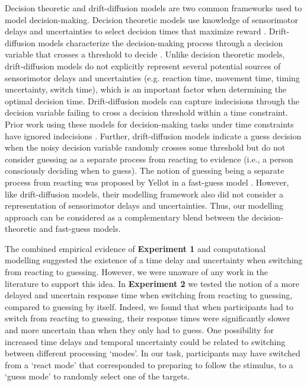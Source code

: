 \documentclass[man,donotrepeattitle,floatsintext,letterpaper,12pt]{apa7}
\newcommand\boldblue[1]{\textcolor{mydarkblue}{\textbf{#1}}}
\begin{document}
Decision theoretic and drift-diffusion models are two common frameworks used to model decision-making. Decision theoretic models use knowledge of sensorimotor delays and uncertainties to select decision times that maximize reward \autocite{mileticCautionDecisionmakingTime2019,balciRiskAssessmentMan2009, onagawaRiskAversionAdjustment2019,battagliaHumansTradeViewing2007}. Drift-diffusion models characterize the decision-making process through a decision variable that crosses a threshold to decide \autocite{ratcliffModeling2alternativeForcedchoice2018,ratcliffDiffusionDecisionModel2008}. Unlike decision theoretic models, drift-diffusion models do not explicitly represent several potential sources of sensorimotor delays and uncertainties (e.g. reaction time, movement time, timing uncertainty, switch time), which is an important factor when determining the optimal decision time. Drift-diffusion models can capture indecisions through the decision variable failing to cross a decision threshold within a time constraint. Prior work using these models for decision-making tasks under time constraints have ignored indecisions \autocite{karsilarSpeedAccuracyTradeoff2014,farashahiDynamicCombinationSensory2018}. Further, drift-diffusion models indicate a guess decision when the noisy decision variable randomly crosses some threshold but do not consider guessing as a separate process from reacting to evidence (i.e., a person consciously deciding when to guess). The notion of guessing being a separate process from reacting was proposed by Yellot in a fast-guess model \autocite{yellottCorrectionFastGuessing1971}. However, like drift-diffusion models, their modelling framework also did not consider a representation of sensorimotor delays and uncertainties. Thus, our modelling approach can be considered as a complementary blend between the decision-theoretic and fast-guess models. 

The combined empirical evidence of \boldblue{Experiment 1} and computational modelling suggested the existence of a time delay and uncertainty when switching from reacting to guessing. However, we were unaware of any work in the literature to support this idea. In \boldblue{Experiment 2} we tested the notion of a more delayed and uncertain response time when switching from reacting to guessing, compared to guessing by itself. Indeed, we found that when participants had to switch from reacting to guessing, their response times were significantly slower and more uncertain than when they only had to guess. One possibility for increased time delays and temporal uncertainty could be related to switching between different processing ‘modes’. In our task, participants may have switched from a `react mode’ that corresponded to preparing to follow the stimulus, to a `guess mode’ to randomly select one of the targets.
\end{document}

